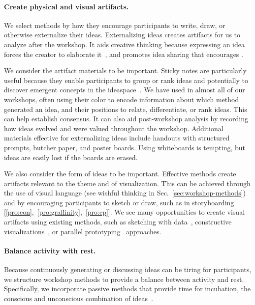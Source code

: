 \paragraph{Create physical and visual artifacts.} We select methods by how they encourage participants to write, draw, or otherwise externalize their ideas. Externalizing ideas creates artifacts for us to analyze after the workshop. It aids creative thinking because expressing an idea forces the creator to elaborate it~\cite{Sawyer2006}, and promotes idea sharing that encourages \collegiality.

We consider the artifact materials to be important. Sticky notes are particularly useful because they enable participants to group or rank ideas and potentially to discover emergent concepts in the ideaspace~\cite{Dove2016}. We have used \stickyNotes in almost all of our workshops, often using their color to encode information about which method generated an idea, and their positions to relate, differentiate, or rank ideas. This can help establish consensus. It can also aid post-workshop analysis by recording how ideas evolved and were valued throughout the workshop. Additional materials effective for externalizing ideas include handouts with structured prompts, butcher paper, and poster boards. Using whiteboards is tempting, but ideas are easily lost if the boards are erased.

We also consider the form of ideas to be important. Effective methods create artifacts relevant to the theme and \topic of visualization. This can be achieved through the use of visual language (see wishful thinking in Sec.~\ref{sec:workshop-methods}) and by encouraging participants to sketch or draw, such as in storyboarding [\ref{pro:eon},~\ref{pro:graffinity},~\ref{pro:cp}]. We see many opportunities to create visual artifacts using existing methods, such as sketching with data~\cite{Walny2015}, constructive visualizations~\cite{Huron2014}, or parallel prototyping~\cite{Roberts2016} approaches.

\paragraph{Balance activity with rest.} Because continuously generating or discussing ideas can be tiring for participants, we structure workshop methods to provide a balance between activity and rest. Specifically, we incorporate passive methods that provide time for incubation, the conscious and unconscious combination of ideas~\cite{Sawyer2006}. 

